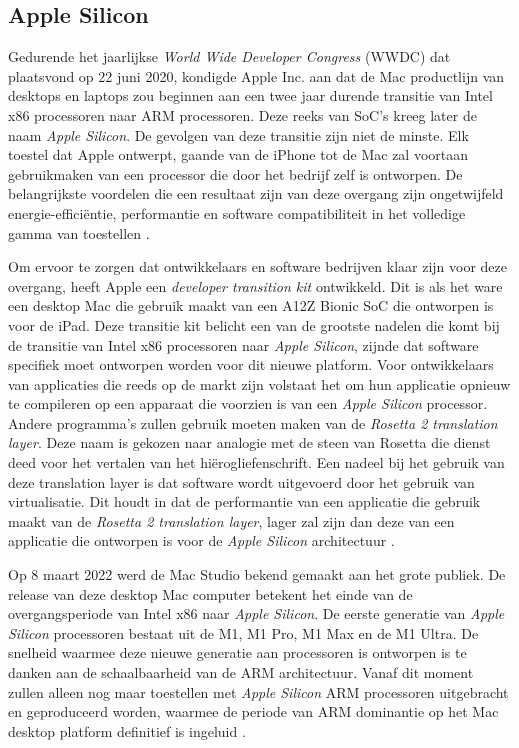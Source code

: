 \subsection{Apple Silicon}
Gedurende het jaarlijkse \textit{World Wide Developer Congress} (WWDC) dat plaatsvond op 22 juni 2020, kondigde Apple Inc. aan dat de Mac productlijn van desktops en laptops zou beginnen aan een twee jaar durende transitie van Intel x86 processoren naar ARM processoren. Deze reeks van SoC’s kreeg later de naam \textit{Apple Silicon}. De gevolgen van deze transitie zijn niet de minste. Elk toestel dat Apple ontwerpt, gaande van de iPhone tot de Mac zal voortaan gebruikmaken van een processor die door het bedrijf zelf is ontworpen. De belangrijkste voordelen die een resultaat zijn van deze overgang zijn ongetwijfeld energie-efficiëntie, performantie en software compatibiliteit in het volledige gamma van toestellen \autocite{Liao2022}.

Om ervoor te zorgen dat ontwikkelaars en software bedrijven klaar zijn voor deze overgang, heeft Apple een \textit{developer transition kit} ontwikkeld. Dit is als het ware een desktop Mac die gebruik maakt van een A12Z Bionic SoC die ontworpen is voor de iPad. Deze transitie kit belicht een van de grootste nadelen die komt bij de transitie van Intel x86 processoren naar \textit{Apple Silicon}, zijnde dat software specifiek moet ontworpen worden voor dit nieuwe platform. Voor ontwikkelaars van applicaties die reeds op de markt zijn volstaat het om hun applicatie opnieuw te compileren op een apparaat die voorzien is van een \textit{Apple Silicon} processor. Andere programma's zullen gebruik moeten maken van de \textit{Rosetta 2 translation layer}. Deze naam is gekozen naar analogie met de steen van Rosetta die dienst deed voor het vertalen van het hiërogliefenschrift. Een nadeel bij het gebruik van deze translation layer is dat software wordt uitgevoerd door het gebruik van virtualisatie. Dit houdt in dat de performantie van een applicatie die gebruik maakt van de \textit{Rosetta 2 translation layer}, lager zal zijn dan deze van een applicatie die ontworpen is voor de \textit{Apple Silicon} architectuur \autocite{Apple2020}.

Op 8 maart 2022 werd de Mac Studio bekend gemaakt aan het grote publiek. De release van deze desktop Mac computer betekent het einde van de overgangsperiode van Intel x86 naar \textit{Apple Silicon}. De eerste generatie van \textit{Apple Silicon} processoren bestaat uit de M1, M1 Pro, M1 Max en de M1 Ultra. De snelheid waarmee deze nieuwe generatie aan processoren is ontworpen is te danken aan de schaalbaarheid van de ARM architectuur. Vanaf dit moment zullen alleen nog maar toestellen met \textit{Apple Silicon} ARM processoren uitgebracht en geproduceerd worden, waarmee de periode van ARM dominantie op het Mac desktop platform definitief is ingeluid \autocite{Apple2022}. 

